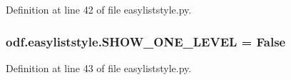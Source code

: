 Definition at line 42 of file easyliststyle.\+py.

\hypertarget{namespaceodf_1_1easyliststyle_aac54725e726263a54b071bae838262b8}{
\subsubsection[{S\+H\+O\+W\+\_\+\+O\+N\+E\+\_\+\+L\+E\+V\+E\+L}]{\setlength{\rightskip}{0pt plus 5cm}odf.\+easyliststyle.\+S\+H\+O\+W\+\_\+\+O\+N\+E\+\_\+\+L\+E\+V\+E\+L = False}}\label{namespaceodf_1_1easyliststyle_aac54725e726263a54b071bae838262b8}


Definition at line 43 of file easyliststyle.\+py.

